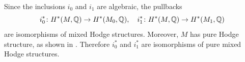 \begin{rmk}
Since the inclusions $i_0$ and $i_1$ are algebraic, the pullbacks
\begin{equation}
i_0^* \colon H^*(M, \mathbb{Q}) \to H^*(M_0, \mathbb{Q}), \quad i_1^* \colon H^*(M, \mathbb{Q}) \to H^*(M_1, \mathbb{Q})
\end{equation}
are isomorphisms of mixed Hodge structures. Moreover, $M$ has pure Hodge structure, as shown in \cite[Corollary 1.3.2]{Hausel-RodriguezVillega}. Therefore $i_0^*$ and $i_1^*$ are isomorphisms of pure mixed Hodge structures.
\end{rmk}
